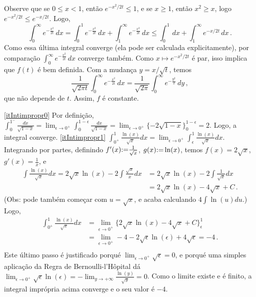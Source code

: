 \begin{Solution}{11.10}
 Observe que se $0\leq x<1$, então $e^{-x^2/2t}\leq 1$,
e se $x\geq 1$, então $x^2\geq x$, logo
$e^{-x^2/2t}\leq e^{-x/2t}$. Logo,
$$\int_{0}^\infty
e^{-\frac{x^2}{2t}}\,dx= \int_{0}^1
e^{-\frac{x^2}{2t}}\,dx+ \int_{1}^\infty
e^{-\frac{x^2}{2t}}\,dx \leq \int_0^1 \,dx+\int_1^\infty
e^{-x/2t}\,dx\,.$$
Como essa última integral converge (ela pode ser calculada
explicitamente), por comparação $\int_{0}^\infty
e^{-\frac{x^2}{2t}}\,dx$ converge também. Como $x\mapsto
e^{-x^2/2t}$ é par, isso implica que $f(t)$ é bem definida.
Com a mudança $y=x/\sqrt{t}$, temos
$$
 \frac{1}{\sqrt{2\pi t}}\int_{0}^\infty
e^{-\frac{x^2}{2t}}\,dx= \frac{1}{\sqrt{2\pi}}\int_{0}^\infty
e^{-\frac{y^2}{2}}\,dy\,,
$$
que não depende de $t$. Assim, $f$ é constante.
\end{Solution}
\begin{Solution}{11.11}
\eqref{itIntimpropr0} Por definição,
$\int_{0}^{1^-}\frac{dx}{\sqrt{1-x}}=\lim_{\epsilon\to
0^+}\int_0^{1-\epsilon}\frac{dx}{\sqrt{1-x}}=
\lim_{\epsilon\to 0^+}\{-2\sqrt{1-x}\}_0^{1-\epsilon}=2$. Logo, a integral
converge.
\eqref{itIntimpropr1} $\int_{0^+}^1\frac{\ln(x)}{\sqrt{x}}dx=\lim_{\epsilon\to
0^+}\int_\epsilon^1\frac{\ln(x)}{\sqrt{x}}dx$.
Integrando por partes, definindo $f'(x){:=} \frac{1}{\sqrt{x}}$, $g(x){:=}
\ln
(x)$, temos $f(x)=2\sqrt{x}$, $g'(x)=\frac{1}{x}$, e
\begin{align*}
\int \frac{\ln(x)}{\sqrt{x}}dx
=2\sqrt{x}\ln (x)-2\int \frac{\sqrt{x}}{x}dx
&=2\sqrt{x}\ln (x)-2\int \frac{1}{\sqrt{x}}dx\\
&=2\sqrt{x}\ln (x)-4\sqrt{x}+C\,.
\end{align*}
(Obs: pode também começar com $u=\sqrt{x}$, e acaba calculando $4\int
\ln(u)du$.)
Logo,
\begin{align*}
\int_{0^+}^1\frac{\ln(x)}{\sqrt{x}}dx&=\lim_{\epsilon\to 0^+}
\big\{
2\sqrt{x}\ln (x)-4\sqrt{x}+C
\big\}_\epsilon^1\\
&=\lim_{\epsilon\to 0^+}
-4-2\sqrt{\epsilon}\ln (\epsilon)+4\sqrt{\epsilon}=-4\,.\\
\end{align*}
Este último passo é justificado porqué $\lim_{\epsilon\to
0^+}\sqrt{\epsilon}=0$, e porqué uma simples aplicação da Regra de
Bernoulli-l'Hôpital dá $\lim_{\epsilon\to 0^+}\sqrt{\epsilon}\ln
(\epsilon)=-\lim_{y\to +\infty}\frac{\ln (y)}{\sqrt{y}}=0$.
Como o limite existe e é finito, a integral imprópria acima { converge e o
seu valor é $-4$}.


\end{Solution}
